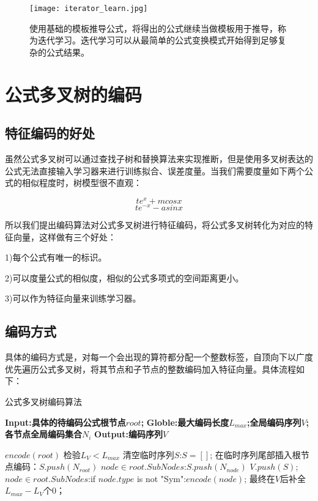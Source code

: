 \documentclass[runningheads]{llncs}
\begin{document}
\begin{figure}[H]
\centering
\texttt{[image: iterator\_learn.jpg]}
\caption{使用基础的模板推导公式，将得出的公式继续当做模板用于推导，称为迭代学习。迭代学习可以从最简单的公式变换模式开始得到足够复杂的公式结果。}
\end{figure}





\section{公式多叉树的编码}

\subsection{特征编码的好处}
虽然公式多叉树可以通过查找子树和替换算法来实现推断，但是使用多叉树表达的公式无法直接输入学习器来进行训练拟合、误差度量。当我们需要度量如下两个公式的相似程度时，树模型很不直观：

$$te^x+mcosx$$
$$te^{-x}-asinx$$

所以我们提出编码算法对公式多叉树进行特征编码，将公式多叉树转化为对应的特征向量，这样做有三个好处：

1)每个公式有唯一的标识。

2)可以度量公式的相似度，相似的公式多项式的空间距离更小。

3)可以作为特征向量来训练学习器。

\subsection{编码方式}
具体的编码方式是，对每一个会出现的算符都分配一个整数标签，自顶向下以广度优先遍历公式多叉树，将其节点和子节点的整数编码加入特征向量。具体流程如下：


\begin{algorithm}[t]
\caption{公式多叉树编码算法} %
\hspace*{0.02in} {\bf Input:具体的待编码公式根节点$root$; } 
\hspace*{0.02in} {\bf Globle:最大编码长度$L_{max}$;全局编码序列$V$;各节点全局编码集合${N_i}$ }
\hspace*{0.02in} {\bf Output:编码序列$V$} 
\begin{algorithmic}[1]
\State $encode(root)$
\State 检验$L_V<L_{max}$
\State 清空临时序列$S$:$S=[]$;
\State 在临时序列尾部插入根节点编码：$S.push(N_{root})$
\State \For $node \in root.SubNodes$:$S.push(N_{node})$\EndFor
\State $V.push(S)$;
\State \For $node \in root.SubNodes$:if $node.type$ is not "Sym":$encode(node)$;\EndFor
\State 最终在$V$后补全$L_{max}-L_{V}$个0；
\end{algorithmic}
\end{algorithm}
\end{document}
